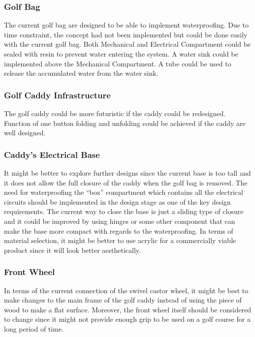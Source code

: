 \documentclass[11pt,landscape]{article}
\begin{document}
\begin{multicols}{2}
    \subsubsection{Golf Bag}
    The current golf bag are designed to be able to implement waterproofing. Due
    to time constraint, the concept had not been implemented but could be done
    easily with the current golf bag. Both Mechanical and Electrical Compartment
    could be sealed with resin to prevent water entering the system. A water
    sink could be implemented above the Mechanical Compartment. A tube could be
    used to release the accumulated water from the water sink.
    
    \subsubsection{Golf Caddy Infrastructure}
    The golf caddy could be more futuristic if the caddy could be redesigned.
    Function of one button folding and unfolding could be achieved if the caddy
    are well designed.
    
    \subsubsection{Caddy's Electrical Base}
    It might be better to explore further designs since the current base is too
    tall and it does not allow the full closure of the caddy when the golf bag
    is removed. The need for waterproofing the “box” compartment which contains
    all the electrical circuits should be implemented in the design stage as one
    of the key design requirements. The current way to close the base is just a
    sliding type of closure and it could be improved by using hinges or some
    other component that can make the base more compact with regards to the
    waterproofing. In terms of material selection, it might be better to use
    acrylic for a commercially viable product since it will look better
    aesthetically. 
    
    \subsubsection{Front Wheel}
    In terms of the current connection of the swivel castor wheel, it might be
    best to make changes to the main frame of the golf caddy instead of using
    the piece of wood to make a flat surface. Moreover, the front wheel itself
    should be considered to change since it might not provide enough grip to be
    used on a golf course for a long period of time.
    
\end{multicols}
\end{document}
